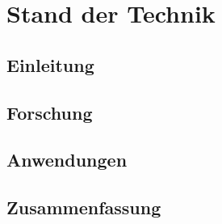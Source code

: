 \section{Stand der Technik}
\subsection{Einleitung}

\subsection{Forschung}

\subsection{Anwendungen}

\subsection{Zusammenfassung}